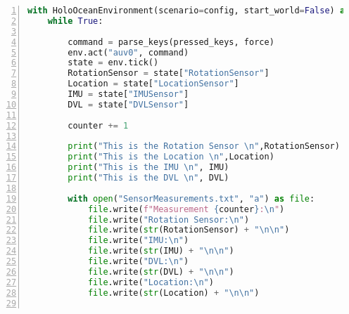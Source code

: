 \documentclass[]{article}
\begin{document}
\begin{lstlisting}[frame=single, numbers=left, language=Python]
with HoloOceanEnvironment(scenario=config, start_world=False) as env:
	while True:

		command = parse_keys(pressed_keys, force)
		env.act("auv0", command)
		state = env.tick()
		RotationSensor = state["RotationSensor"]
		Location = state["LocationSensor"]
		IMU = state["IMUSensor"]
		DVL = state["DVLSensor"]

		counter += 1

		print("This is the Rotation Sensor \n",RotationSensor)
		print("This is the Location \n",Location)
		print("This is the IMU \n", IMU)
		print("This is the DVL \n", DVL)

		with open("SensorMeasurements.txt", "a") as file:
			file.write(f"Measurement {counter}:\n")
			file.write("Rotation Sensor:\n")
			file.write(str(RotationSensor) + "\n\n")
			file.write("IMU:\n")
			file.write(str(IMU) + "\n\n")
			file.write("DVL:\n")
			file.write(str(DVL) + "\n\n")
			file.write("Location:\n")
			file.write(str(Location) + "\n\n")
		
\end{lstlisting}
\end{document}
